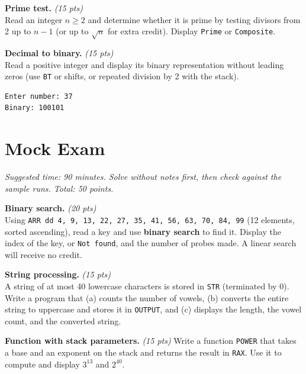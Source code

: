 \documentclass[11pt,letterpaper]{article}
\newcommand{\pts}[1]{\hfill\textit{(#1 pts)}}
\newcommand{\ttl}[1]{\textbf{#1.}}
\begin{document}
\begin{problems}
\item \ttl{Prime test} \pts{15}
\\Read an integer $n \ge 2$ and determine whether it is prime by testing divisors from 2 up to $n-1$ (or up to $\sqrt{n}$ for extra credit). Display \texttt{Prime} or \texttt{Composite}.

\item \ttl{Decimal to binary} \pts{15}
\\Read a positive integer and display its binary representation without leading zeros (use \texttt{BT} or shifts, or repeated division by 2 with the stack).
\begin{lstlisting}[style=out]
Enter number: 37
Binary: 100101
\end{lstlisting}

\end{problems}

\newpage
\section{Mock Exam}

\noindent\textit{Suggested time: 90 minutes. Solve without notes first, then check against the sample runs. Total: 50 points.}

\begin{problems}

\item \ttl{Binary search} \pts{20}
\\Using \texttt{ARR dd 4, 9, 13, 22, 27, 35, 41, 56, 63, 70, 84, 99} (12 elements, sorted ascending), read a key and use \textbf{binary search} to find it. Display the index of the key, or \texttt{Not found}, and the number of probes made. A linear search will receive no credit.

\item \ttl{String processing} \pts{15}
\\A string of at most 40 lowercase characters is stored in \texttt{STR} (terminated by 0). Write a program that (a) counts the number of vowels, (b) converts the entire string to uppercase and stores it in \texttt{OUTPUT}, and (c) displays the length, the vowel count, and the converted string.

\item \ttl{Function with stack parameters} \pts{15}
Write a function \texttt{POWER} that takes a base and an exponent on the stack and returns the result in \texttt{RAX}. Use it to compute and display $3^{13}$ and $2^{40}$.

\end{problems}
\end{document}
